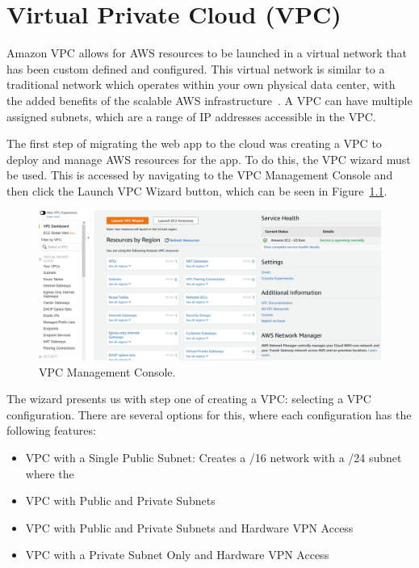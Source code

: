 \chapter{Virtual Private Cloud (VPC)}\label{ch:vpc}

Amazon VPC allows for AWS resources to be launched in a virtual network that has been custom defined and configured.
This virtual network is similar to a traditional network which operates within your own physical data center, with the
added benefits of the scalable AWS infrastructure~\parencite{amazon2022what}.
A VPC can have multiple assigned subnets, which are a range of IP addresses accessible in the VPC\@.

The first step of migrating the web app to the cloud was creating a VPC to deploy and manage AWS resources for the app.
To do this, the VPC wizard must be used.
This is accessed by navigating to the VPC Management Console and then click the Launch VPC Wizard button, which can be
seen in Figure~\ref{fig:vpc-wizard}.

\begin{figure}[!htbp]
    \centering
    \includegraphics[width=\textwidth]{resources/vpc/vpc-dashboard}
    \caption{VPC Management Console.}
    \label{fig:vpc-wizard}
\end{figure}

The wizard presents us with step one of creating a VPC: selecting a VPC configuration.
There are several options for this, where each configuration has the following features:

\begin{itemize}
    \item VPC with a Single Public Subnet: Creates a /16 network with a /24 subnet where the
    \item VPC with Public and Private Subnets
    \item VPC with Public and Private Subnets and Hardware VPN Access
    \item VPC with a Private Subnet Only and Hardware VPN Access
\end{itemize}
